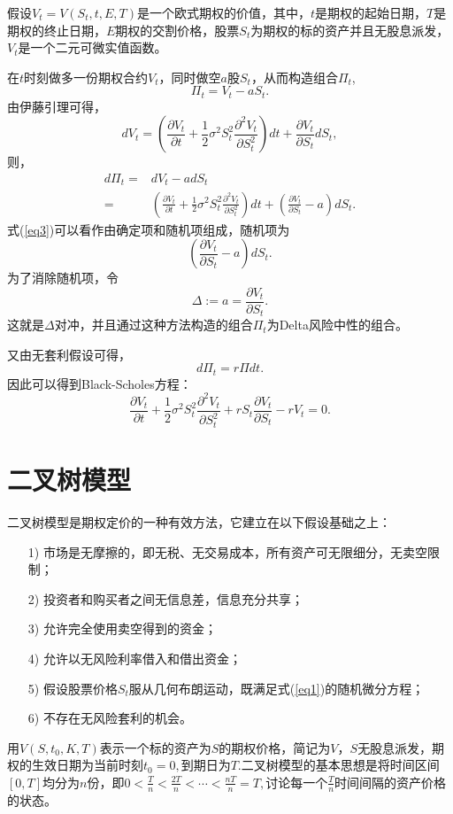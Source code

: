 假设$V_t = V(S_t,t,E,T)$是一个欧式期权的价值，其中，$t$是期权的起始日期，$T$是期权的终止日期，$E$期权的交割价格，股票$S_t$为期权的标的资产并且无股息派发，$V_t$是一个二元可微实值函数。

在$t$时刻做多一份期权合约$V_t$，同时做空$a$股$S_t$，从而构造组合$\Pi_t$,
$$\Pi_t = V_t - a S_t.$$
由伊藤引理可得，
$$dV_t = \left(\frac{\partial V_t}{\partial t}+\frac{1}{2}\sigma^2S^2_t \frac{\partial^2 V_t}{\partial S_t^2} \right)dt + \frac{\partial V_t}{\partial S_t}dS_t,$$
则，
\begin{align}
	\label{eq3}
	d\Pi_t = & dV_t - adS_t \nonumber \\
	= & \left(\frac{\partial V_t}{\partial t}+\frac{1}{2}\sigma^2S^2_t \frac{\partial^2 V_t}{\partial S_t^2} \right)dt + \left(\frac{\partial V_t}{\partial S_t} - a \right) dS_t.
\end{align}
式(\ref{eq3})可以看作由确定项和随机项组成，随机项为$$\left(\frac{\partial V_t}{\partial S_t} - a \right) dS_t.$$
为了消除随机项，令$$\Delta := a = \frac{\partial V_t}{\partial S_t} .$$这就是$\Delta$对冲，并且通过这种方法构造的组合$\Pi_t$为Delta风险中性的组合。

又由无套利假设可得，
$$d\Pi_t = r\Pi dt.$$
因此可以得到Black-Scholes方程：
$$\frac{\partial V_t}{\partial t} +\frac{ 1}{2}\sigma^2 S_t^2 \frac{\partial^2 V_t}{\partial S_t^2}
+rS_t\frac{\partial V_t}{\partial S_t}-rV_t = 0. $$

\section{二叉树模型}
二叉树模型是期权定价的一种有效方法，它建立在以下假设基础之上：
\begin{enumerate}[itemindent=2em,fullwidth]
	\item[1)] 市场是无摩擦的，即无税、无交易成本，所有资产可无限细分，无卖空限制；
	\item[2)] 投资者和购买者之间无信息差，信息充分共享；
	\item[3)] 允许完全使用卖空得到的资金；
	\item[4)] 允许以无风险利率借入和借出资金；
	\item[5)] 假设股票价格$S_t$服从几何布朗运动，既满足式(\ref{eq1})的随机微分方程；
	\item[6)] 不存在无风险套利的机会。
\end{enumerate}

用$V(S,t_0,K,T)$表示一个标的资产为$S$的期权价格，简记为$V$，$S$无股息派发，期权的生效日期为当前时刻$t_0=0,$到期日为$T$.二叉树模型的基本思想是将时间区间$[0,T]$均分为$n$份，即$0<\frac{T}{n}<\frac{2T}{n}<\cdots<\frac{nT}{n}=T,$讨论每一个$\frac{T}{n}$时间间隔的资产价格的状态。

